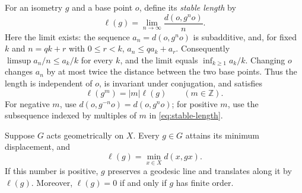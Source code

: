 For an isometry $g$ and a base point $o$, define its \emph{stable length} by
\begin{equation}\label{eq:stable-length}
 \ell(g)=\lim_{n\to\infty}\frac{d(o,g^n o)}{n}.
\end{equation}
Here the limit exists: the sequence $a_n=d(o,g^n o)$ is subadditive, and,
for fixed $k$ and $n=qk+r$ with $0\le r<k$,
$a_n\le q a_k+a_r$.  Consequently
$\limsup a_n/n\le a_k/k$ for every $k$, and the limit equals
$\inf_{k\ge1}a_k/k$.  Changing $o$ changes $a_n$ by at most twice the
distance between the two base points.  Thus the length is independent of
$o$, is invariant under conjugation, and satisfies
\begin{equation}\label{eq:length-powers}
 \ell(g^m)=|m|\ell(g)\qquad(m\in\mathbb Z).
\end{equation}
For negative $m$, use $d(o,g^{-n}o)=d(o,g^n o)$; for positive $m$, use the
subsequence indexed by multiples of $m$ in \eqref{eq:stable-length}.

\begin{lemma}\label{lem:semisimple}
Suppose $G$ acts geometrically on $X$.  Every $g\in G$ attains its minimum
displacement, and
\[
 \ell(g)=\min_{x\in X}d(x,gx).
\]
If this number is positive, $g$ preserves a geodesic line and translates
along it by $\ell(g)$.  Moreover, $\ell(g)=0$ if and only if $g$ has finite
order.
\end{lemma}

